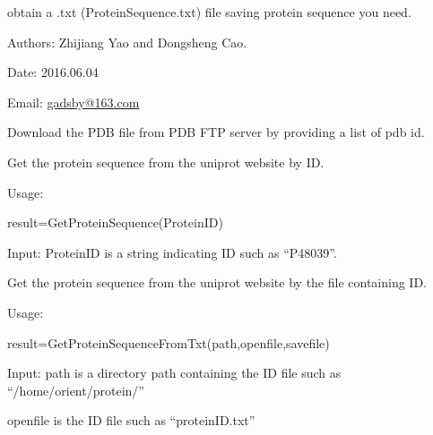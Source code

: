 \documentclass[letterpaper,10pt,english]{sphinxmanual}
\begin{document}
obtain a .txt (ProteinSequence.txt) file saving protein sequence you need.

Authors: Zhijiang Yao and Dongsheng Cao.

Date: 2016.06.04

Email: \href{mailto:gadsby@163.com}{gadsby@163.com}

\begin{fulllineitems}
\label{reference/GetProtein:GetProtein.GetPDB}
Download the PDB file from PDB FTP server by providing a list of pdb id.

\end{fulllineitems}


\begin{fulllineitems}
\label{reference/GetProtein:GetProtein.GetProteinSequence}
Get the protein sequence from the uniprot website by ID.

Usage:

result=GetProteinSequence(ProteinID)

Input: ProteinID is a string indicating ID such as ``P48039''.

\end{fulllineitems}


\begin{fulllineitems}
\label{reference/GetProtein:GetProtein.GetProteinSequenceFromTxt}
Get the protein sequence from the uniprot website by the file containing ID.

Usage:

result=GetProteinSequenceFromTxt(path,openfile,savefile)

Input: path is a directory path containing the ID file such as ``/home/orient/protein/''

openfile is the ID file such as ``proteinID.txt''

\end{fulllineitems}

\end{document}
